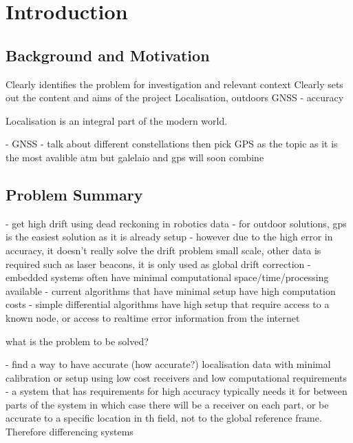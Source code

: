 
\def\chapdir{./ChapterIntro}

\chapter{Introduction} \label{ch:intro}



\section{Background and Motivation}

Clearly identifies the problem for investigation and relevant context
Clearly sets out the content and aims of the project
Localisation, outdoors GNSS
- accuracy 

Localisation is an integral part of the modern world.

- GNSS - talk about different constellations then pick GPS as the topic as it is the most avalible atm but galelaio and gps will soon combine








\section{Problem Summary}
- get high drift using dead reckoning in robotics data
- for outdoor solutions, gps is the easiest solution as it is already setup
- however due to the high error in accuracy, it doesn't really solve the drift problem small scale, other data is required such as laser beacons, it is only used as global drift correction
- embedded systems often have minimal computational space/time/processing available 
- current algorithms that have minimal setup have high computation costs
- simple differential algorithms have high setup that require access to a known node, or access to realtime error information from the internet


what is the problem to be solved?

- find a way to have accurate (how accurate?) localisation data with minimal calibration or setup using low cost receivers and low computational requirements  
- a system that has requirements for high accuracy typically needs it for between parts of the system in which case there will be a receiver on each part, or be accurate to a specific location in th field, not to the global reference frame. Therefore differencing systems

